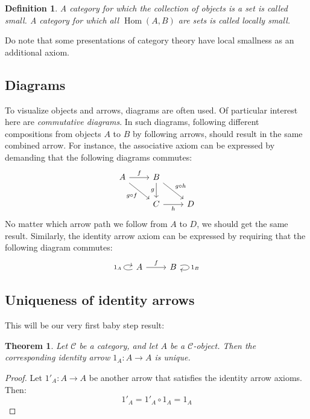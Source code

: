 \documentclass[12pt, a4paper]{article}
\newtheorem{theorem}{Theorem}[section]
\newtheorem{definition}{Definition}[section]
\numberwithin{equation}{section}
\DeclareMathOperator{\Hom}{Hom}
\begin{document}
\begin{definition}
A category for which the collection of objects is a set is called small. A category for which all $\Hom(A,B)$ are sets is called locally small.
\end{definition}
Do note that some presentations of category theory have local smallness as an additional axiom.

\subsection{Diagrams}
To visualize objects and arrows, diagrams are often used. Of particular interest here are \textit{commutative diagrams}. In such diagrams, following different compositions from objects $A$ to $B$ by following arrows, should result in the same combined arrow. For instance, the associative axiom can be expressed by demanding that the following diagrams commutes:
\begin{equation*}
\begin{tikzcd}
A\arrow[r, "f"]
\arrow[dr, swap, "g\circ f"]
&
B\arrow[dr, "g\circ h"]
\arrow[d, swap, "g"]
\\
{}&
C\arrow[r, swap, "h"]
&
D
\end{tikzcd}
\end{equation*}
No matter which arrow path we follow from $A$ to $D$, we should get the same result. Similarly, the identity arrow axiom can be expressed by requiring that the following diagram commutes:
\begin{equation*}
\begin{tikzcd}
A\arrow[r, "f"]
\arrow[loop left,"1_A"] &
B\arrow[loop right,"1_B"]
\end{tikzcd}
\end{equation*}

\subsection{Uniqueness of identity arrows}
This will be our very first baby step result:
\begin{theorem}
Let $\mathcal{C}$ be a category, and let $A$ be a $\mathcal{C}$-object. Then the corresponding identity arrow $1_A: A\rightarrow A$ is unique.
\end{theorem}
\begin{proof}
Let $1'_A: A\rightarrow A$ be another arrow that satisfies the identity arrow axioms. Then:
\begin{equation}
1'_A=1'_A\circ 1_A=1_A
\end{equation}
\end{proof}
\end{document}

